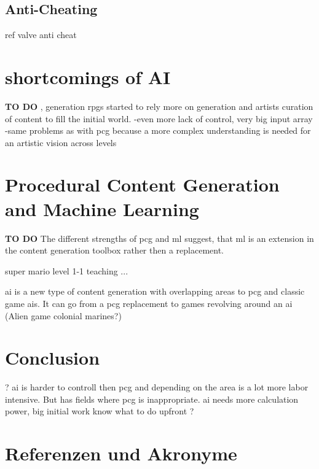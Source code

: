 \documentclass[10pt,a4paper]{article}
\begin{document}
\subsection{Anti-Cheating}
ref valve anti cheat

\section{shortcomings of AI}
\textbf{TO DO}
, generation \gls{rpg}s started to rely more on generation and artists curation of content to fill the initial world.
-even more lack of control, very big input array
-same problems as with \gls{pcg} because a more complex understanding is needed for an artistic vision across levels

\section{Procedural Content Generation and Machine Learning}
\textbf{TO DO}
The different strengths of \gls{pcg} and \gls{ml} suggest, that \gls{ml} is an extension in the content generation toolbox rather then a replacement.

super mario level 1-1 teaching ...

\gls{ai} is a new type of content generation with overlapping areas to \gls{pcg} and classic game \gls{ai}s. It can go from a \gls{pcg} replacement to games revolving around an \gls{ai} (Alien game colonial marines?)

\section{Conclusion}

?
ai is harder to controll then \gls{pcg} and depending on the area is a lot more labor intensive. But has fields where \gls{pcg} is inappropriate.
ai needs more calculation power, big initial work
know what to do upfront
?

\section{Referenzen und Akronyme}

\printglossaries


%
%

%


\listoffigures
\listoftables

\end{document}
